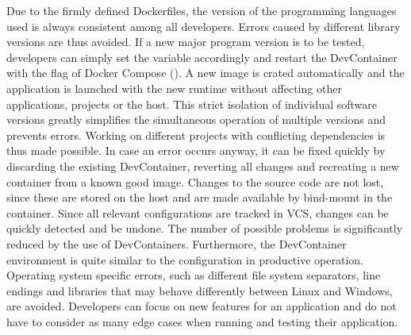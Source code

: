         Due to the firmly defined Dockerfiles, the version of the programming languages used is always consistent among all developers. Errors caused by different library versions are thus avoided. If a new major program version is to be tested, developers can simply set the  variable accordingly and restart the DevContainer with the  flag of Docker Compose (). A new image is crated automatically and the application is launched with the new runtime without affecting other applications, projects or the host. This strict isolation of individual software versions greatly simplifies the simultaneous operation of multiple versions and prevents errors. Working on different projects with conflicting dependencies is thus made possible.\newline
        In case an error occurs anyway, it can be fixed quickly by discarding the existing DevContainer, reverting all changes and recreating a new container from a known good image. Changes to the source code are not lost, since these are stored on the host and are made available by bind-mount in the container. Since all relevant configurations are tracked in \ac{VCS}, changes can be quickly detected and be undone.\newline
        The number of possible problems is significantly reduced by the use of DevContainers. Furthermore, the DevContainer environment is quite similar to the configuration in productive operation. Operating system specific errors, such as different file system separators, line endings and libraries that may behave differently between Linux and Windows, are avoided. Developers can focus on new features for an application and do not have to consider as many edge cases when running and testing their application.

